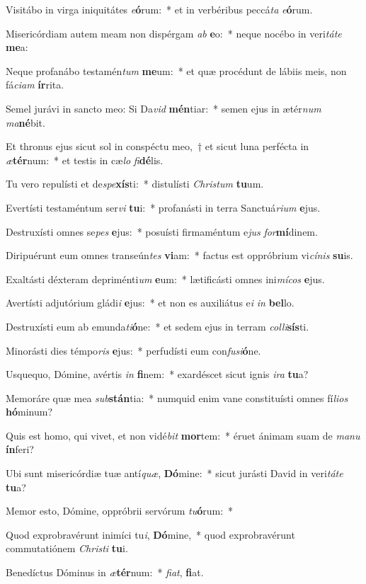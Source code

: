 \item Visitábo in virga iniquitátes \textit{e}\textbf{ó}rum:~* et in verbéribus peccá\textit{ta} \textit{e}\textbf{ó}rum.
\item Misericórdiam autem meam non dispérgam \textit{ab} \textbf{e}o:~* neque nocébo in veri\textit{tá}\textit{te} \textbf{me}a:
\item Neque profanábo testamén\textit{tum} \textbf{me}um:~* et quæ procédunt de lábiis meis, non fá\textit{ci}\textit{am} \textbf{ír}rita.
\item Semel jurávi in sancto meo: Si Da\textit{vid} \textbf{mén}tiar:~* semen ejus in ætér\textit{num} \textit{ma}\textbf{né}bit.
\item Et thronus ejus sicut sol in conspéctu meo,~† et sicut luna perfécta in \textit{æ}\textbf{tér}num:~* et testis in cæ\textit{lo} \textit{fi}\textbf{dé}lis.
\item Tu vero repulísti et de\textit{spe}\textbf{xís}ti:~* distulísti \textit{Chris}\textit{tum} \textbf{tu}um.
\item Evertísti testaméntum ser\textit{vi} \textbf{tu}i:~* profanásti in terra Sanctuá\textit{ri}\textit{um} \textbf{e}jus.
\item Destruxísti omnes se\textit{pes} \textbf{e}jus:~* posuísti firmaméntum e\textit{jus} \textit{for}\textbf{mí}dinem.
\item Diripuérunt eum omnes transeún\textit{tes} \textbf{vi}am:~* factus est oppróbrium vi\textit{cí}\textit{nis} \textbf{su}is.
\item Exaltásti déxteram depriménti\textit{um} \textbf{e}um:~* lætificásti omnes ini\textit{mí}\textit{cos} \textbf{e}jus.
\item Avertísti adjutórium gládi\textit{i} \textbf{e}jus:~* et non es auxiliátus e\textit{i} \textit{in} \textbf{bel}lo.
\item Destruxísti eum ab emunda\textit{ti}\textbf{ó}ne:~* et sedem ejus in terram \textit{col}\textit{li}\textbf{sís}ti.
\item Minorásti dies témpo\textit{ris} \textbf{e}jus:~* perfudísti eum con\textit{fu}\textit{si}\textbf{ó}ne.
\item Usquequo, Dómine, avértis \textit{in} \textbf{fi}nem:~* exardéscet sicut ignis \textit{i}\textit{ra} \textbf{tu}a?
\item Memoráre quæ mea \textit{sub}\textbf{stán}tia:~* numquid enim vane constituísti omnes fí\textit{li}\textit{os} \textbf{hó}minum?
\item Quis est homo, qui vivet, et non vidé\textit{bit} \textbf{mor}tem:~* éruet ánimam suam de \textit{ma}\textit{nu} \textbf{ín}feri?
\item Ubi sunt misericórdiæ tuæ antí\textit{quæ}, \textbf{Dó}mine:~* sicut jurásti David in veri\textit{tá}\textit{te} \textbf{tu}a?
\item Memor esto, Dómine, oppróbrii servórum \textit{tu}\textbf{ó}rum:~* 
\item Quod exprobravérunt inimíci tu\textit{i}, \textbf{Dó}mine,~* quod exprobravérunt commutatiónem \textit{Chris}\textit{ti} \textbf{tu}i.
\item Benedíctus Dóminus in \textit{æ}\textbf{tér}num:~* \textit{fi}\textit{at}, \textbf{fi}at.
